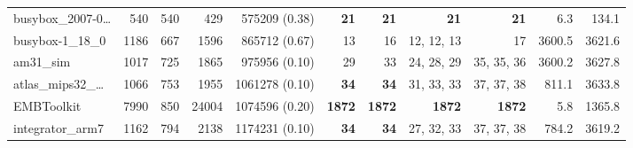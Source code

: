 \begin{table*}
\begin{tiny}
{{\begin{tabular}{lrrrrrrrrrr}
busybox\_2007-0\ldots & \num[text-series-to-math=true]{540} & \num[text-series-to-math=true]{540} & \num[text-series-to-math=true]{429} & \num[text-series-to-math=true]{575209} (\num[text-series-to-math=true]{0.38}) & \textbf{\num[text-series-to-math=true]{21}} & \textbf{\num[text-series-to-math=true]{21}} & \textbf{\num[text-series-to-math=true]{21}} & \textbf{\num[text-series-to-math=true]{21}} & 6.3 & 134.1\\
busybox-1\_18\_0 & \num[text-series-to-math=true]{1186} & \num[text-series-to-math=true]{667} & \num[text-series-to-math=true]{1596} & \num[text-series-to-math=true]{865712} (\num[text-series-to-math=true]{0.67}) & \num[text-series-to-math=true]{13} & \num[text-series-to-math=true]{16} & \num[text-series-to-math=true]{12}, \num[text-series-to-math=true]{12}, \num[text-series-to-math=true]{13} & \num[text-series-to-math=true]{17} & 3600.5 & 3621.6\\
am31\_sim & \num[text-series-to-math=true]{1017} & \num[text-series-to-math=true]{725} & \num[text-series-to-math=true]{1865} & \num[text-series-to-math=true]{975956} (\num[text-series-to-math=true]{0.10}) & \num[text-series-to-math=true]{29} & \num[text-series-to-math=true]{33} & \num[text-series-to-math=true]{24}, \num[text-series-to-math=true]{28}, \num[text-series-to-math=true]{29} & \num[text-series-to-math=true]{35}, \num[text-series-to-math=true]{35}, \num[text-series-to-math=true]{36} & 3600.2 & 3627.8\\
atlas\_mips32\_\ldots & \num[text-series-to-math=true]{1066} & \num[text-series-to-math=true]{753} & \num[text-series-to-math=true]{1955} & \num[text-series-to-math=true]{1061278} (\num[text-series-to-math=true]{0.10}) & \textbf{\num[text-series-to-math=true]{34}} & \textbf{\num[text-series-to-math=true]{34}} & \num[text-series-to-math=true]{31}, \num[text-series-to-math=true]{33}, \num[text-series-to-math=true]{33} & \num[text-series-to-math=true]{37}, \num[text-series-to-math=true]{37}, \num[text-series-to-math=true]{38} & 811.1 & 3633.8\\
EMBToolkit & \num[text-series-to-math=true]{7990} & \num[text-series-to-math=true]{850} & \num[text-series-to-math=true]{24004} & \num[text-series-to-math=true]{1074596} (\num[text-series-to-math=true]{0.20}) & \textbf{\num[text-series-to-math=true]{1872}} & \textbf{\num[text-series-to-math=true]{1872}} & \textbf{\num[text-series-to-math=true]{1872}} & \textbf{\num[text-series-to-math=true]{1872}} & 5.8 & 1365.8\\
integrator\_arm7 & \num[text-series-to-math=true]{1162} & \num[text-series-to-math=true]{794} & \num[text-series-to-math=true]{2138} & \num[text-series-to-math=true]{1174231} (\num[text-series-to-math=true]{0.10}) & \textbf{\num[text-series-to-math=true]{34}} & \textbf{\num[text-series-to-math=true]{34}} & \num[text-series-to-math=true]{27}, \num[text-series-to-math=true]{32}, \num[text-series-to-math=true]{33} & \num[text-series-to-math=true]{37}, \num[text-series-to-math=true]{37}, \num[text-series-to-math=true]{38} & 784.2 & 3619.2\\

\end{tabular}}}
\end{tiny}
\end{table*}
